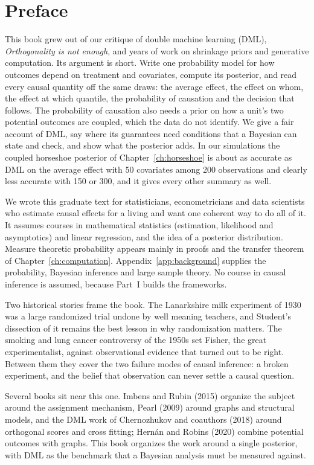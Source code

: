 \chapter{Preface}

This book grew out of our critique of double machine learning (DML), \emph{Orthogonality is not enough}, and years of work on shrinkage priors and generative computation. Its argument is short. Write one probability model for how outcomes depend on treatment and covariates, compute its posterior, and read every causal quantity off the same draws: the average effect, the effect on whom, the effect at which quantile, the probability of causation and the decision that follows. The probability of causation also needs a prior on how a unit's two potential outcomes are coupled, which the data do not identify. We give a fair account of DML, say where its guarantees need conditions that a Bayesian can state and check, and show what the posterior adds. In our simulations the coupled horseshoe posterior of Chapter~\ref{ch:horseshoe} is about as accurate as DML on the average effect with 50 covariates among 200 observations and clearly less accurate with 150 or 300, and it gives every other summary as well.

We wrote this graduate text for statisticians, econometricians and data scientists who estimate causal effects for a living and want one coherent way to do all of it. It assumes courses in mathematical statistics (estimation, likelihood and asymptotics) and linear regression, and the idea of a posterior distribution. Measure theoretic probability appears mainly in proofs and the transfer theorem of Chapter~\ref{ch:computation}. Appendix~\ref{app:background} supplies the probability, Bayesian inference and large sample theory. No course in causal inference is assumed, because Part~I builds the frameworks.

Two historical stories frame the book. The Lanarkshire milk experiment of 1930 was a large randomized trial undone by well meaning teachers, and Student's dissection of it remains the best lesson in why randomization matters. The smoking and lung cancer controversy of the 1950s set Fisher, the great experimentalist, against observational evidence that turned out to be right. Between them they cover the two failure modes of causal inference: a broken experiment, and the belief that observation can never settle a causal question.

Several books sit near this one. Imbens and Rubin (2015) organize the subject around the assignment mechanism, Pearl (2009) around graphs and structural models, and the DML work of Chernozhukov and coauthors (2018) around orthogonal scores and cross fitting; Hern\'an and Robins (2020) combine potential outcomes with graphs. This book organizes the work around a single posterior, with DML as the benchmark that a Bayesian analysis must be measured against.

